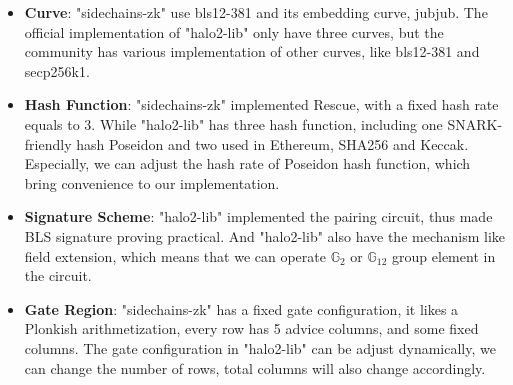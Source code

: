 \documentclass{article}
\begin{document}
\begin{itemize}
    \item \textbf{Curve}: "sidechains-zk" use bls12-381 and its embedding curve, jubjub. The official implementation of "halo2-lib" only have three curves, but the community has various implementation of other curves, like bls12-381 and secp256k1.
    
    \item \textbf{Hash Function}: "sidechains-zk" implemented Rescue, with a fixed hash rate equals to 3. While "halo2-lib" has three hash function, including one SNARK-friendly hash Poseidon and two used in Ethereum, SHA256 and Keccak. Especially, we can adjust the hash rate of Poseidon hash function, which bring convenience to our implementation.

    \item \textbf{Signature Scheme}: "halo2-lib" implemented the pairing circuit, thus made BLS signature proving practical. And "halo2-lib" also have the mechanism like field extension, which means that we can operate $\mathbb
    {G}_2$ or $\mathbb{G}_{12}$ group element in the circuit.

    \item \textbf{Gate Region}: "sidechains-zk" has a fixed gate configuration, it likes a Plonkish arithmetization, every row has 5 advice columns, and some fixed columns. The gate configuration in "halo2-lib" can be adjust dynamically, we can change the number of rows, total columns will also change accordingly.
    
\end{itemize}
\end{document}
